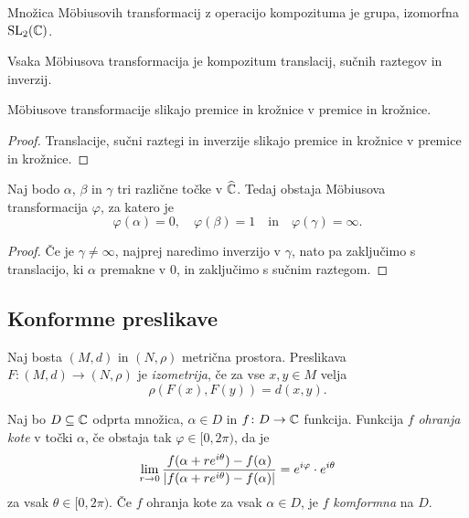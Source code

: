 \begin{opomba}
Množica Möbiusovih transformacij z operacijo kompozituma je grupa,
izomorfna $\operatorname{SL}_2(\mathbb{C})$.
\end{opomba}

\begin{trditev}
Vsaka Möbiusova transformacija je kompozitum translacij, sučnih
raztegov in inverzij.
\end{trditev}

\obvs

\begin{trditev}
Möbiusove transformacije slikajo premice in krožnice v premice in
krožnice.
\end{trditev}

\begin{proof}
Translacije, sučni raztegi in inverzije slikajo premice in krožnice
v premice in krožnice.
\end{proof}

\begin{trditev}
Naj bodo $\alpha$, $\beta$ in $\gamma$ tri različne točke v
$\widehat{\mathbb{C}}$. Tedaj obstaja Möbiusova transformacija $\varphi$,
za katero je
\[
\varphi(\alpha) = 0, \quad
\varphi(\beta) = 1
\quad \text{in} \quad
\varphi(\gamma) = \infty.
\]
\end{trditev}

\begin{proof}
Če je $\gamma \ne \infty$, najprej naredimo inverzijo v $\gamma$,
nato pa zaključimo s translacijo, ki $\alpha$ premakne v $0$, in
zaključimo s sučnim raztegom.
\end{proof}

\newpage

\subsection{Konformne preslikave}

\begin{definicija}
Naj bosta $(M, d)$ in $(N, \rho)$ metrična prostora. Preslikava
$F \colon (M, d) \to (N, \rho)$ je
\emph{izometrija}, če za vse
$x, y \in M$ velja
\[
\rho(F(x), F(y)) = d(x, y).
\]
\end{definicija}

\begin{definicija}
Naj bo $D \subseteq \mathbb{C}$ odprta množica, $\alpha \in D$ in
$f \colon D \to \mathbb{C}$ funkcija. Funkcija $f$
\emph{ohranja kote} v točki $\alpha$,
če obstaja tak $\varphi \in [0, 2 \pi)$, da je
\[
\lim_{r \to 0}
\frac{f(\alpha + r e^{i \theta}) - f(\alpha)}
{\left\lvert f(\alpha + r e^{i \theta}) - f(\alpha)\right\rvert} =
e^{i \varphi} \cdot e^{i \theta}
\]
za vsak $\theta \in [0, 2 \pi)$. Če $f$ ohranja kote za vsak
$\alpha \in D$, je $f$ \emph{komformna}
na $D$.
\end{definicija}

